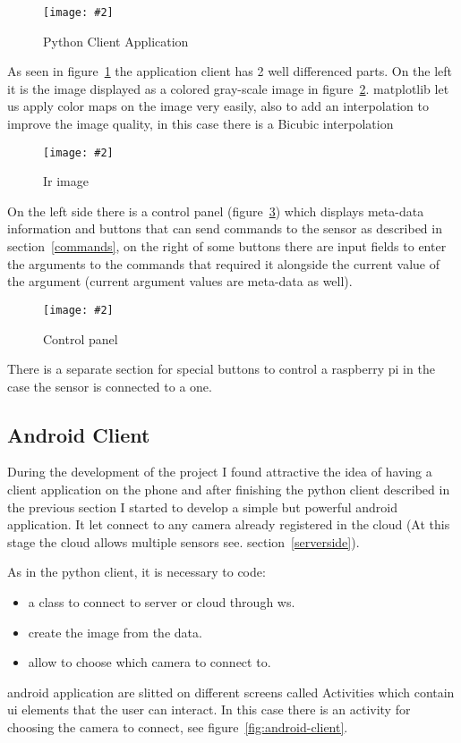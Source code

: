 \documentclass[hidelinks,11pt,a4paper,oneside,article]{memoir}
\newcommand{\putimage}[3][10] %
{
\begin{figure}[h]
	\centering
	\captionsetup{justification=centering}
	\texttt{[image: \#2]}
	\caption{#3}
	\label{fig:#2}
\end{figure}
}
\begin{document}
    \putimage{python-client}{Python Client Application}
    
As seen in figure~\ref{fig:python-client} the application client has 2 well differenced parts. On the left it is the image displayed as a colored gray-scale image in figure~\ref{fig:ir-image}. \gls{matplotlib} let us apply color maps on the image very easily, also to add an interpolation to improve the image quality, in this case there is a Bicubic interpolation %

    \putimage[5]{ir-image}{Ir image}

On the left side there is a control panel (figure~\ref{fig:control-panel}) which displays meta-data information and buttons that can send commands to the sensor as described in section~\ref{commands}, on the right of some buttons there are input fields to enter the arguments to the commands that required it alongside the current value of the argument (current argument values are meta-data as well).

    \putimage{control-panel}{Control panel}
    
There is a separate section for special buttons to control a raspberry pi in the case the sensor is connected to a one.


\subsection{Android Client}
During the development of the project I found attractive the idea of having a client application on the phone and after finishing the python client described in the previous section I started to develop a simple but powerful \gls{android} application. It let connect to any camera already registered in the cloud (At this stage the cloud allows multiple sensors see. section~\ref{serverside}).

As in the python client, it is necessary to code:
\begin{itemize}
    \item a class to connect to server or cloud through \gls{ws}.
    \item create the image from the data.
    \item allow to choose which camera to connect to.
\end{itemize}

\gls{android} application are slitted on different screens called Activities which contain \gls{ui} elements that the user can interact. In this case there is an activity for choosing the camera to connect, see figure~\ref{fig:android-client}.
\end{document}
